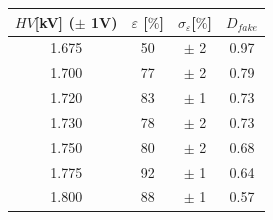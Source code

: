     \begin{tabular}{cccc}
    \toprule
    $HV$[kV] ($\pm$ 1V)& $\varepsilon$ [$\%$] & $\sigma_{\varepsilon}$[$\%$] & $D_{fake}$ \\
    \midrule
    1.675 & 50 & $\pm$ 2 & 0.97 \\
    1.700 & 77 & $\pm$ 2 & 0.79 \\
    1.720 & 83 & $\pm$ 1 & 0.73 \\
    1.730 & 78 & $\pm$ 2 & 0.73 \\
    1.750 & 80 & $\pm$ 2 & 0.68 \\
    1.775 & 92 & $\pm$ 1 & 0.64 \\
    1.800 & 88 & $\pm$ 1 & 0.57 \\
    \bottomrule
    \end{tabular}